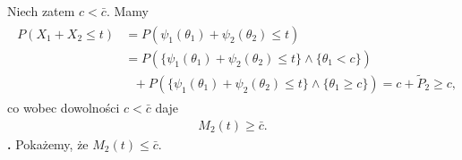\documentclass[12pt,a4paper,openany]{book}
\newcommand{\RomanNumeralCaps}[1]
    {\MakeUppercase{\romannumeral #1}}
\begin{document}
\noindent Niech zatem $c < \bar c$. Mamy 
\begin{gather}
\begin{split}
P(X_{1} + X_{2} \leqslant t) &= P(\psi_{1}(\theta_{1}) + \psi_{2}(\theta_{2}) \leqslant t) \\ \nonumber
								  &= P(\lbrace \psi_{1}(\theta_{1}) + \psi_{2}(\theta_{2}) \leqslant t \rbrace \wedge \lbrace \theta_{1} < c \rbrace) \\ \nonumber
								  & ~~~ + P(\lbrace \psi_{1}(\theta_{1}) + \psi_{2}(\theta_{2}) \leqslant t \rbrace \wedge \lbrace \theta_{1} \geqslant c \rbrace) = c + \tilde{P}_{2} \geqslant c,  \nonumber		     
\end{split}
\end{gather}
co wobec dowolności $c < \bar c$ daje
\begin{gather}
M_{2}(t) \geqslant \bar c.
\end{gather}
\noindent \textbf{\RomanNumeralCaps{2}.} Pokażemy, że $M_{2}(t) \leqslant \bar c$.
\end{document}
